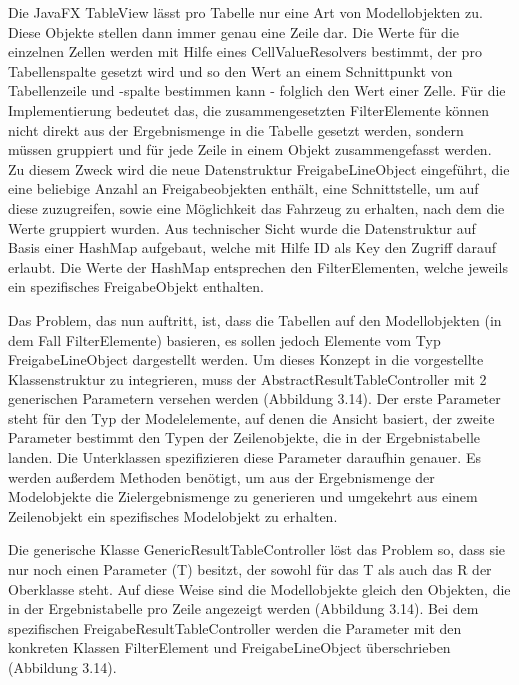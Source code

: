 Die JavaFX TableView lässt pro Tabelle nur eine Art von Modellobjekten zu. Diese Objekte stellen dann immer genau eine Zeile dar. Die Werte für die einzelnen Zellen werden mit Hilfe eines CellValueResolvers bestimmt, der pro Tabellenspalte gesetzt wird und so den Wert an einem Schnittpunkt von Tabellenzeile und -spalte bestimmen kann - folglich den Wert einer Zelle. Für die Implementierung bedeutet das, die zusammengesetzten FilterElemente können nicht direkt aus der Ergebnismenge in die Tabelle gesetzt werden, sondern müssen gruppiert und für jede Zeile in einem Objekt zusammengefasst werden. Zu diesem Zweck wird die neue Datenstruktur FreigabeLineObject eingeführt, die eine beliebige Anzahl an Freigabeobjekten enthält, eine Schnittstelle, um auf diese zuzugreifen, sowie eine Möglichkeit das Fahrzeug zu erhalten, nach dem die Werte gruppiert wurden. Aus technischer Sicht wurde die Datenstruktur auf Basis einer HashMap aufgebaut, welche mit Hilfe ID als Key den Zugriff darauf erlaubt. Die Werte der HashMap entsprechen den FilterElementen, welche jeweils ein spezifisches FreigabeObjekt enthalten.

Das Problem, das nun auftritt, ist, dass die Tabellen auf den Modellobjekten (in dem Fall FilterElemente) basieren, es sollen jedoch Elemente vom Typ FreigabeLineObject dargestellt werden. Um dieses Konzept in die vorgestellte Klassenstruktur zu integrieren, muss der AbstractResultTableController mit 2 generischen Parametern versehen werden (Abbildung 3.14). Der erste Parameter steht für den Typ der Modelelemente, auf denen die Ansicht basiert, der zweite Parameter bestimmt den Typen der Zeilenobjekte, die in der Ergebnistabelle landen. Die Unterklassen spezifizieren diese Parameter daraufhin genauer. Es werden außerdem Methoden benötigt, um aus der Ergebnismenge der Modelobjekte die Zielergebnismenge zu generieren und umgekehrt aus einem Zeilenobjekt ein spezifisches Modelobjekt zu erhalten.

Die generische Klasse GenericResultTableController löst das Problem so, dass sie nur noch einen Parameter (T) besitzt, der sowohl für das T als auch das R der Oberklasse steht. Auf diese Weise sind die Modellobjekte gleich den Objekten, die in der Ergebnistabelle pro Zeile angezeigt werden (Abbildung 3.14). Bei dem spezifischen FreigabeResultTableController werden die Parameter mit den konkreten Klassen FilterElement und FreigabeLineObject überschrieben (Abbildung 3.14).

